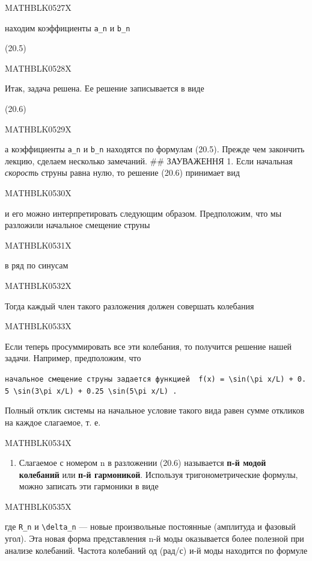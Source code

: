 \documentclass[
  ukrainian,
]{article}
\providecommand{\tightlist}{%
  \setlength{\itemsep}{0pt}\setlength{\parskip}{0pt}}
\begin{document}
MATHBLK0527X

находим коэффициенты \texttt{a\_n} и \texttt{b\_n}

(20.5)

MATHBLK0528X

Итак, задача решена. Ее решение записывается в виде

(20.6)

MATHBLK0529X

а коэффициенты \texttt{a\_n} и \texttt{b\_n} находятся по формулам
(20.5). Прежде чем закончить лекцию, сделаем несколько замечаний. \#\#
ЗАУВАЖЕННЯ 1. Если начальная \emph{скорость} струны равна нулю, то
решение (20.6) принимает вид

MATHBLK0530X

и его можно интерпретировать следующим образом. Предположим, что мы
разложили начальное смещение струны

MATHBLK0531X

в ряд по синусам

MATHBLK0532X

Тогда каждый член такого разложения должен совершать колебания

MATHBLK0533X

Если теперь просуммировать все эти колебания, то получится решение нашей
задачи. Например, предположим, что

\texttt{начальное\ смещение\ струны\ задается\ функцией\ \ \textquotesingle{}f(x)\ =\ \textbackslash{}sin(\textbackslash{}pi\ x/L)\ +\ 0.5\ \textbackslash{}sin(3\textbackslash{}pi\ x/L)\ +\ 0.25\ \textbackslash{}sin(5\textbackslash{}pi\ x/L)\textquotesingle{}\ .}

Полный отклик системы на начальное условие такого вида равен сумме
откликов на каждое слагаемое, т. е.

MATHBLK0534X

\begin{enumerate}
\def\labelenumi{\arabic{enumi}.}
\setcounter{enumi}{1}
\tightlist
\item
  Слагаемое с номером n в разложении (20.6) называется \textbf{п-й модой
  колебаний} или \textbf{п-й гармоникой}. Используя тригонометрические
  формулы, можно записать эти гармоники в виде
\end{enumerate}

MATHBLK0535X

где \texttt{R\_n} и \texttt{\textbackslash{}delta\_n} --- новые
произвольные постоянные (амплитуда и фазовый угол). Эта новая форма
представления n-й моды оказывается более полезной при анализе колебаний.
Частота колебаний од (рад/с) и-й моды находится по формуле
\end{document}
